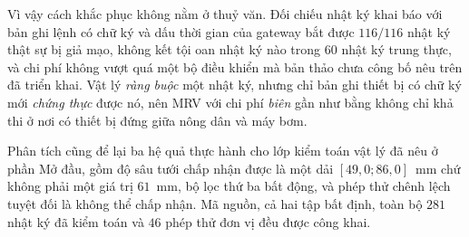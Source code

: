 Vì vậy cách khắc phục không nằm ở thuỷ văn. Đối chiếu nhật ký khai báo với bản ghi lệnh có
chữ ký và dấu thời gian của gateway bắt được $116/116$ nhật ký thật sự bị giả mạo, không
kết tội oan nhật ký nào trong $60$ nhật ký trung thực, và chi phí không vượt quá một bộ điều khiển mà bản thảo chưa công bố nêu trên đã triển khai. Vật lý \emph{ràng buộc}
một nhật ký, nhưng chỉ bản ghi thiết bị có chữ ký mới \emph{chứng thực} được nó, nên MRV
với chi phí \emph{biên} gần như bằng không chỉ khả thi ở nơi có thiết bị đứng giữa nông
dân và máy bơm.

Phân tích cũng để lại ba hệ quả thực hành cho lớp kiểm toán vật lý đã nêu ở phần Mở
đầu, gồm độ sâu tưới chấp nhận được là một dải $[49{,}0; 86{,}0]$~mm chứ không phải
một giá trị $61$~mm, bộ lọc thứ ba bất động, và phép thử chênh lệch tuyệt đối là
không thể chấp nhận. Mã nguồn, cả hai tập bất định, toàn bộ $281$ nhật ký đã kiểm toán và
$46$ phép thử đơn vị đều được công khai.
